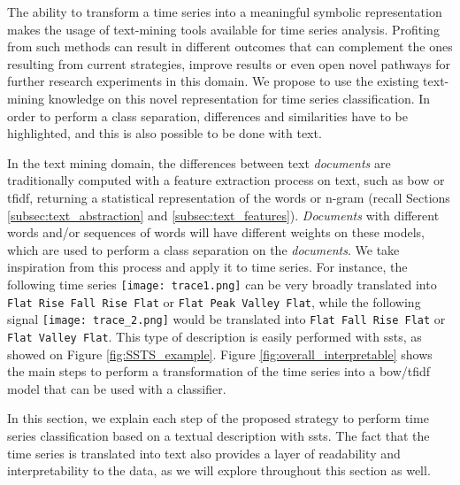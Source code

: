 The ability to transform a time series into a meaningful symbolic representation makes the usage of text-mining tools available for time series analysis. Profiting from such methods can result in different outcomes that can complement the ones resulting from current strategies, improve results or even open novel pathways for further research experiments in this domain. We propose to use the existing text-mining knowledge on this novel representation for time series classification. In order to perform a class separation, differences and similarities have to be highlighted, and this is also possible to be done with text. 

In the text mining domain, the differences between text \textit{documents} are traditionally computed with a feature extraction process on text, such as \gls{bow} or \gls{tfidf}, returning a statistical representation of the words or n-gram (recall Sections \ref{subsec:text_abstraction} and \ref{subsec:text_features}). \textit{Documents} with different words and/or sequences of words will have different weights on these models, which are used to perform a class separation on the \textit{documents}. We take inspiration from this process and apply it to time series. For instance, the following time series \texttt{[image: trace1.png]} can be very broadly translated into \texttt{Flat Rise Fall Rise Flat} or \texttt{Flat Peak Valley Flat}, while the following signal \texttt{[image: trace\_2.png]} would be translated into \texttt{Flat Fall Rise Flat} or \texttt{Flat Valley Flat}. This type of description is easily performed with \gls{ssts}, as showed on Figure \ref{fig:SSTS_example}. Figure \ref{fig:overall_interpretable} shows the main steps to perform a transformation of the time series into a \gls{bow}/\gls{tfidf} model that can be used with a classifier. 

In this section, we explain each step of the proposed strategy to perform time series classification based on a textual description with \gls{ssts}. The fact that the time series is translated into text also provides a layer of readability and interpretability to the data, as we will explore throughout this section as well.

